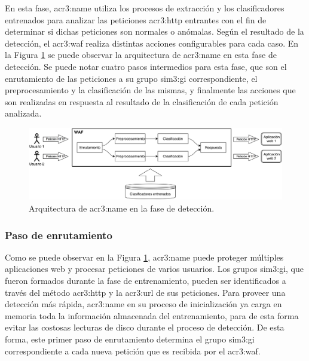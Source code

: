 En esta fase, \gls{acr3:name} utiliza los procesos de extracción y
los clasificadores entrenados para analizar las peticiones \gls{acr3:http}
entrantes con el fin de determinar si dichas peticiones son normales o
anómalas. Según el resultado de la detección, el \gls{acr3:waf} realiza
distintas acciones configurables para cada caso.
En la Figura \ref{fig:waf:waf_diagram_detection} se puede observar la
arquitectura de \gls{acr3:name} en esta fase de detección.
Se puede notar cuatro pasos intermedios para esta fase, que son el
enrutamiento de las peticiones a su grupo \gls{sim3:gi} correspondiente,
el preprocesamiento y la clasificación de las mismas, y finalmente las
acciones que son realizadas en respuesta al resultado de la clasificación
de cada petición analizada.

\begin{figure}[ht]
    \centering
    \includegraphics[width=\linewidth]{images/waf-diagram-detection.png}

    \caption{Arquitectura de \gls{acr3:name} en la fase de
        detección.}
    \label{fig:waf:waf_diagram_detection}
\end{figure}


\subsubsection{Paso de enrutamiento}

Como se puede observar en la Figura \ref{fig:waf:waf_diagram_detection},
\gls{acr3:name} puede proteger múltiples aplicaciones web y procesar
peticiones de varios usuarios. Los grupos \gls{sim3:gi}, que fueron
formados durante la fase de entrenamiento, pueden ser identificados a
través del método \gls{acr3:http} y la \gls{acr3:url} de sus peticiones.
Para proveer una detección más rápida, \gls{acr3:name} en su proceso de
inicialización ya carga en memoria toda la información almacenada del
entrenamiento, para de esta forma evitar las costosas lecturas de disco
durante el proceso de detección.
De esta forma, este primer paso de enrutamiento determina el grupo
\gls{sim3:gi} correspondiente a cada nueva petición que es recibida
por el \gls{acr3:waf}.

